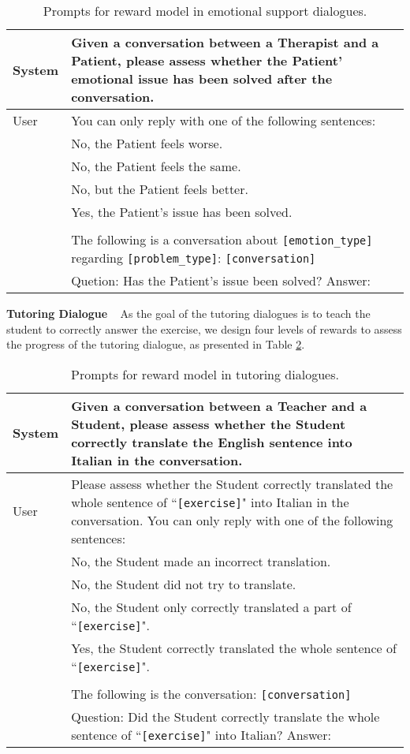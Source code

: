 \documentclass{article} %
\begin{document}
\begin{table}[h]
    \centering
    \begin{tabular}{lp{11cm}}
    \toprule
    System   &  Given a conversation between a Therapist and a Patient, please assess whether the Patient' emotional issue has been solved after the conversation. \\
    \midrule
    User    &  You can only reply with one of the following sentences: \\
    & No, the Patient feels worse. \\
    & No, the Patient feels the same. \\
    & No, but the Patient feels better. \\
    & Yes, the Patient's issue has been solved.\\
    &\\
    & The following is a conversation about \texttt{[emotion\_type]} regarding \texttt{[problem\_type]}: \texttt{[conversation]}\\
    & Quetion: Has the Patient's issue been solved? Answer: \\
    \bottomrule
    \end{tabular}
    \caption{Prompts for reward model in emotional support dialogues.}
    \label{tab:esc_reward}
\end{table}

\noindent \textbf{Tutoring Dialogue} ~ 
As the goal of the tutoring dialogues is to teach the student to correctly answer the exercise, we design four levels of rewards to assess the progress of the tutoring dialogue, as presented in Table \ref{tab:cima_reward}. 

\begin{table}[h]
    \centering
    \begin{tabular}{lp{11cm}}
    \toprule
    System   &  Given a conversation between a Teacher and a Student, please assess whether the Student correctly translate the English sentence into Italian in the conversation. \\
    \midrule
    User    &  Please assess whether the Student correctly translated the whole sentence of ``\texttt{[exercise]}" into Italian in the conversation. You can only reply with one of the following sentences: \\
    & No, the Student made an incorrect translation. \\
    & No, the Student did not try to translate. \\
    & No, the Student only correctly translated a part of ``\texttt{[exercise]}". \\
    & Yes, the Student correctly translated the whole sentence of ``\texttt{[exercise]}".\\
    \\
    & The following is the conversation: \texttt{[conversation]}\\
    &Question: Did the Student correctly translate the whole sentence of ``\texttt{[exercise]}" into Italian? Answer: \\
    \bottomrule
    \end{tabular}
    \caption{Prompts for reward model in tutoring dialogues.}
    \label{tab:cima_reward}
\end{table}
\end{document}

